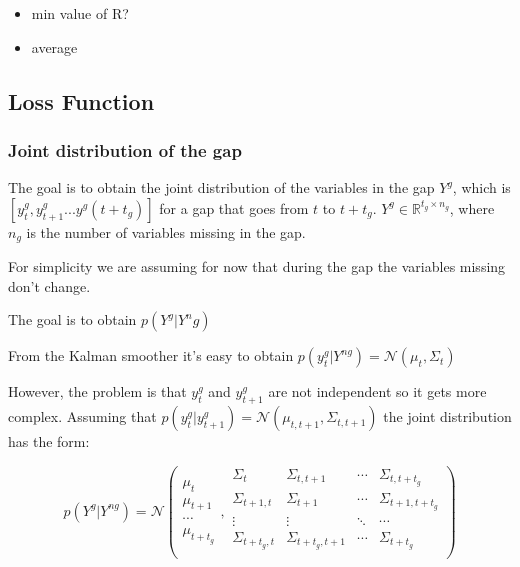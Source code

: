 \documentclass{article}
\begin{document}
\begin{itemize}
    \item min value of R?
    \item average 
\end{itemize}

\subsection{Loss Function}

\subsubsection{Joint distribution of the gap}

The goal is to obtain the joint distribution of the variables in the gap $Y^g$, which is $[y^g_t, y^g_{t+1} ... y^g(t+t_g)]$
for a gap that goes from $t$ to $t+t_g$. $Y^g \in \mathbb{R}^{t_g \times n_g}$, where $n_g$ is the number of variables missing in the gap.

For simplicity we are assuming for now that during the gap the variables missing don't change.

The goal is to obtain $p(Y^g|Y^ng)$

From the Kalman smoother it's easy to obtain $p(y^g_t|Y^{ng}) = \mathcal{N}(\mu_{t}, \Sigma_{t})$

However, the problem is that $y^g_t$ and $y^g_{t+1}$ are not independent so it gets more complex.
Assuming that $p(y^g_t|y^g_{t+1}) = \mathcal{N}(\mu_{t,t+1}, \Sigma_{t,t+1})$ the joint distribution has the form:

$$ p(Y^g|Y^{ng}) = \mathcal{N}\left(\begin{array}{c}
     \mu_{t}   \\
     \mu_{t+1} \\
     \cdots    \\
     \mu_{t+t_g}
\end{array},
\begin{array}{cccc}
    \Sigma_{t}       & \Sigma_{t,t+1}     & \cdots & \Sigma_{t,t+t_g}   \\
    \Sigma_{t+1,t}   & \Sigma_{t+1}       & \cdots & \Sigma_{t+1,t+t_g} \\
    \vdots           & \vdots             & \ddots & \cdots             \\ 
    \Sigma_{t+t_g,t} & \Sigma_{t+t_g,t+1} & \cdots & \Sigma_{t+t_g}     \\
\end{array}\right)$$
\end{document}
